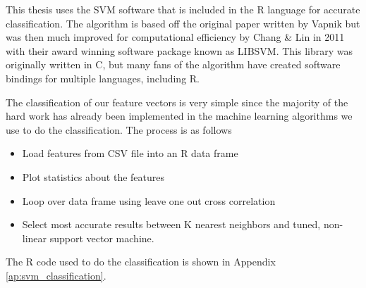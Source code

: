 This thesis uses the SVM software that is included in the R language for
accurate classification. The algorithm is based off the original paper written
by Vapnik \cite{cortes1995support} but was then much improved for computational
efficiency by Chang \& Lin in 2011 \cite{chang2011libsvm} with their award
winning software package known as LIBSVM. This library was originally written
in C, but many fans of the algorithm have created software bindings for multiple
languages, including R.

The classification of our feature vectors is very simple since the majority of
the hard work has already been implemented in the machine learning algorithms
we use to do the classification. The process is as follows


\begin{itemize}
  \item Load features from CSV file into an R data frame
  \item Plot statistics about the features
  \item Loop over data frame using leave one out cross correlation
  \item Select most accurate results between K nearest neighbors and tuned, non-linear
  support vector machine.
\end{itemize}

The R code used to do the classification is shown in Appendix
\ref{ap:svm_classification}.
